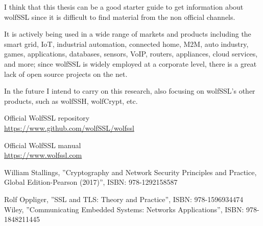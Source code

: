 \documentclass[a4paper,12pt]{article}
\begin{document}
I think that this thesis can be a good starter guide to get information about wolfSSL since it is difficult to find material from the non official channels.

It is actively being used in a wide range of markets and products including the smart grid, IoT, industrial automation, connected home, M2M, auto industry, games, applications, databases, sensors, VoIP, routers, appliances, cloud services, and more; since wolfSSL is widely employed at a corporate level, there is a great lack of open source projects on the net.

In the future I intend to carry on this research, also focusing on wolfSSL's other products, such as wolfSSH, wolfCrypt, etc.

\begin{thebibliography}{9}

Official WolfSSL repository
\\\url{https://www.github.com/wolfSSL/wolfssl}

Official WolfSSL manual
\\\url{https://www.wolfssl.com}

William Stallings, ''Cryptography and Network Security Principles and Practice, Global Edition-Pearson (2017)'',
ISBN: 978-1292158587

Rolf Oppliger, ''SSL and TLS: Theory and Practice'',
ISBN: 978-1596934474
Wiley, ''Communicating Embedded Systems: Networks Applications'',
ISBN: 978-1848211445

\end{thebibliography}
\end{document}
